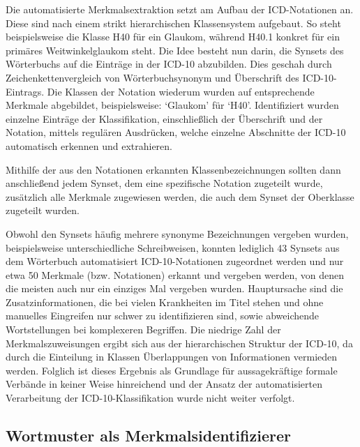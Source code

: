 \documentclass[pagesize,DIV=calc,12pt,draft]{scrreprt}
\begin{document}
Die automatisierte Merkmalsextraktion setzt am Aufbau der ICD-Notationen
an. Diese sind nach einem strikt hierarchischen Klassensystem aufgebaut.
So steht beispielsweise die Klasse H40 für ein Glaukom, während H40.1
konkret für ein primäres Weitwinkelglaukom steht. Die Idee besteht nun
darin, die Synsets des Wörterbuchs auf die Einträge in der ICD-10
abzubilden. Dies geschah durch Zeichenkettenvergleich von
Wörterbuchsynonym und Überschrift des ICD-10-Eintrags. Die Klassen der
Notation wiederum wurden auf entsprechende Merkmale abgebildet,
beispielsweise: `Glaukom' für `H40'. Identifiziert wurden einzelne
Einträge der Klassifikation, einschließlich der Überschrift und der
Notation, mittels regulären Ausdrücken, welche einzelne Abschnitte der
ICD-10 automatisch erkennen und extrahieren.

Mithilfe der aus den Notationen erkannten Klassenbezeichnungen sollten
dann anschließend jedem Synset, dem eine spezifische Notation zugeteilt
wurde, zusätzlich alle Merkmale zugewiesen werden, die auch dem Synset
der Oberklasse zugeteilt wurden.

Obwohl den Synsets häufig mehrere synonyme Bezeichnungen vergeben
wurden, beispielsweise unterschiedliche Schreibweisen, konnten lediglich
43 Synsets aus dem Wörterbuch automatisiert ICD-10-Notationen zugeordnet
werden und nur etwa 50 Merkmale (bzw. Notationen) erkannt und vergeben
werden, von denen die meisten auch nur ein einziges Mal vergeben wurden.
Hauptursache sind die Zusatzinformationen, die bei vielen Krankheiten im
Titel stehen und ohne manuelles Eingreifen nur schwer zu identifizieren
sind, sowie abweichende Wortstellungen bei komplexeren Begriffen. Die
niedrige Zahl der Merkmalszuweisungen ergibt sich aus der hierarchischen
Struktur der ICD-10, da durch die Einteilung in Klassen Überlappungen
von Informationen vermieden werden. Folglich ist dieses Ergebnis als
Grundlage für aussagekräftige formale Verbände in keiner Weise
hinreichend und der Ansatz der automatisierten Verarbeitung der
ICD-10-Klassifikation wurde nicht weiter verfolgt.

\subsection{Wortmuster als Merkmalsidentifizierer}
\end{document}
